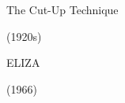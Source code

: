 \documentclass{beamer}
\begin{document}
\begin{frame}[c]
	\centering
	\Huge
	The Cut-Up Technique
	
	(1920s)
\end{frame}


\begin{frame}[plain]
\end{frame}

\begin{frame}[c]
	\centering
	\Huge
	ELIZA
	
	(1966)
\end{frame}

\begin{frame}[plain]
\end{frame}
\end{document}
